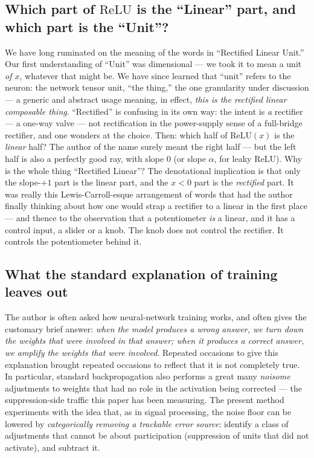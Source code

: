 \documentclass[11pt]{article}
\newcommand{\relu}{\mathrm{ReLU}}
\begin{document}
\subsection{Which part of $\relu$ is the ``Linear'' part, and which
part is the ``Unit''?}

We have long ruminated on the meaning of the words in ``Rectified
Linear Unit.'' Our first understanding of ``Unit'' was dimensional
--- we took it to mean a unit \emph{of $x$}, whatever that might be.
We have since learned that ``unit'' refers to the neuron: the network
tensor unit, ``the thing,'' the one granularity under discussion ---
a generic and abstract usage meaning, in effect, \emph{this is the
rectified linear composable thing}. ``Rectified'' is confusing in its
own way: the intent is \emph{a} rectifier --- a one-way valve --- not
rectification in the power-supply sense of a full-bridge rectifier,
and one wonders at the choice. Then: which half of $\relu(x)$ is the
\emph{linear} half? The author of the name surely meant the right
half --- but the left half is also a perfectly good ray, with slope
$0$ (or slope $\alpha$, for leaky $\relu$). Why is the whole thing
``Rectified Linear''? The denotational implication is that only the
slope-$+1$ part is the linear part, and the $x < 0$ part is the
\emph{rectified} part. It was really this Lewis-Carroll-esque
arrangement of words that had the author finally thinking about how
one would strap a rectifier to a linear in the first place --- and
thence to the observation that a potentiometer \emph{is} a linear,
and it has a control input, a slider or a knob. The knob does not
control the rectifier. It controls the potentiometer behind it.

\subsection{What the standard explanation of training leaves out}

The author is often asked how neural-network training works, and
often gives the customary brief answer: \emph{when the model
produces a wrong answer, we turn down the weights that were involved
in that answer; when it produces a correct answer, we amplify the
weights that were involved}. Repeated occasions to give this
explanation brought repeated occasions to reflect that it is not
completely true. In particular, standard backpropagation also
performs a great many \emph{noisome} adjustments to weights that had
no role in the activation being corrected --- the suppression-side
traffic this paper has been measuring. The present method experiments
with the idea that, as in signal processing, the noise floor can be
lowered by \emph{categorically removing a trackable error source}:
identify a class of adjustments that cannot be about participation
(suppression of units that did not activate), and subtract it.
\end{document}
